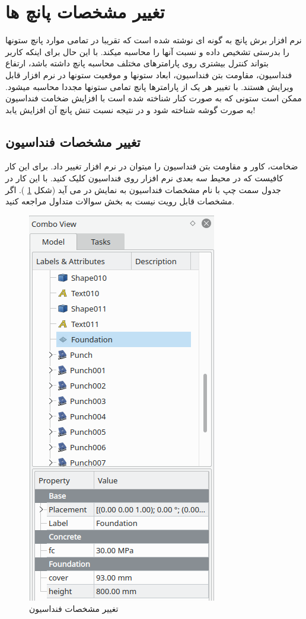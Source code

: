 \section{تغییر مشخصات پانچ ها}

نرم افزار برش پانچ به گونه ای نوشته شده است که تقریبا در تمامی موارد پانچ ستونها را بدرستی تشخیص داده و نسبت آنها را محاسبه میکند. با این حال برای اینکه کاربر بتواند کنترل بیشتری روی 
پارامترهای مختلف محاسبه پانچ داشته باشد، ارتفاع فنداسیون، مقاومت بتن فنداسیون، ابعاد ستونها و موقعیت ستونها در نرم افزار قابل ویرایش هستند.
با تغییر هر یک از پارامترها پانچ تمامی ستونها مجددا محاسبه میشود. ممکن است ستونی که به صورت کنار شناخته شده است با افزایش ضخامت فنداسیون به صورت گوشه شناخته شود و در نتیجه 
نسبت تنش پانچ آن افزایش یابد!

\subsection{تغییر مشخصات فنداسیون}
ضخامت، کاور و مقاومت بتن فنداسیون را میتوان در نرم افزار تغییر داد. برای این کار کافیست که در محیط سه بعدی نرم افزار روی فنداسیون کلیک کنید. با این کار در جدول سمت چپ با نام
مشخصات فنداسیون به نمایش در می آید (شکل 
\ref{fig:comboview}
). اگر مشخصات قابل رویت نیست به بخش سوالات متداول مراجعه کنید. 

\begin{figure}[H]
    \centering
    \includegraphics{figures/comboview}
    \caption{تغییر مشخصات فنداسیون}
    \label{fig:comboview}
\end{figure}

